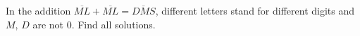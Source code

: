 In the addition $\overline{ML}+\overline{ML}=\overline{DMS}$, different letters stand for different digits and $M$, $D$ are not $0$. Find all solutions.
